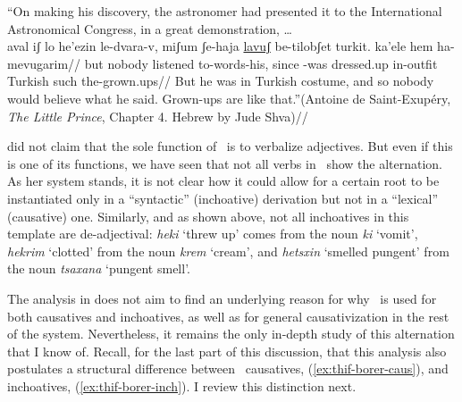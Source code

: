 	\a ``On making his discovery, the astronomer had presented it to the International Astronomical Congress, in a great demonstration, \dots\\
	\begingl
		\gla aval iʃ lo he'ezin le-dvara-v, miʃum ʃe-haja \underline{lavuʃ} be-tilobʃet turkit. ka'ele hem ha-mevugarim//
		\glb but nobody  listened to-words-his, since -was dressed.up in-outfit Turkish such  the-grown.ups//
		\glft But he was in Turkish costume, and so nobody would believe what he said. Grown-ups are like that.''\hfill {(Antoine de Saint-Exup\'ery, \emph{The Little Prince}, Chapter 4. Hebrew by Jude Shva\footnotemark)}//
	\endgl
{}
\xe

\cite{borer91} did not claim that the sole function of \thif~is to verbalize adjectives. But even if this is one of its functions, we have seen that not all verbs in \thif~show the alternation. As her system stands, it is not clear how it could allow for a certain root to be instantiated only in a ``syntactic'' (inchoative) derivation but not in a ``lexical'' (causative) one. Similarly, and as shown above, not all inchoatives in this template are de-adjectival: \emph{heki} `threw up' comes from the noun \emph{ki} `vomit', \emph{hekrim} `clotted' from the noun \emph{krem} `cream', and \emph{hetsxin} `smelled pungent' from the noun \emph{tsaxana} `pungent smell'.

The analysis in \cite{borer91} does not aim to find an underlying reason for why \thif~is used for both causatives and inchoatives, as well as for general causativization in the rest of the system. Nevertheless, it remains the only in-depth study of this alternation that I know of. Recall, for the last part of this discussion, that this analysis also postulates a structural difference between \thif~causatives, (\ref{ex:thif-borer-caus}), and inchoatives, (\ref{ex:thif-borer-inch}). I review this distinction next.

